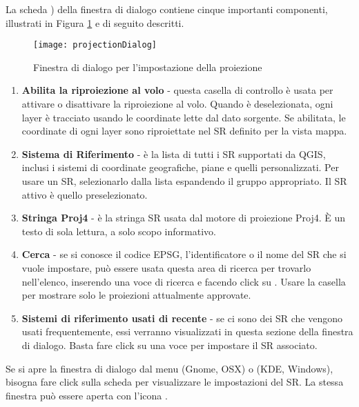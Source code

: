 La scheda ) della finestra di dialogo 
contiene cinque importanti componenti, illustrati in Figura \ref{fig:projections} e di seguito descritti.

\begin{figure}[ht]
   \centering
   \texttt{[image: projectionDialog]}
   \caption{Finestra di dialogo per l'impostazione della proiezione \nixcaption}\label{fig:projections}
\end{figure}

\begin{enumerate}
\item \textbf{Abilita la riproiezione al volo} -
questa casella di controllo è usata per attivare o disattivare la riproiezione al volo. 
Quando è deselezionata, ogni layer è tracciato usando le coordinate lette dal dato sorgente. 
Se abilitata, le coordinate di ogni layer sono riproiettate nel SR definito per la vista mappa.
\item \textbf{Sistema di Riferimento} - è la lista di tutti i SR supportati da QGIS, inclusi i
sistemi di coordinate geografiche, piane e quelli personalizzati. Per usare un SR, selezionarlo
dalla lista espandendo il gruppo appropriato. Il SR attivo è quello preselezionato.
\item \textbf{Stringa Proj4} - è la stringa SR usata dal motore di proiezione Proj4. 
È un testo di sola lettura, a solo scopo informativo.
\item \textbf{Cerca} - se si conosce il codice EPSG, l'identificatore o il nome del SR che si vuole impostare, 
può essere usata questa area di ricerca per trovarlo nell'elenco, inserendo una voce di ricerca e facendo click 
su . Usare la casella  per mostrare solo le proiezioni attualmente approvate.
\item \textbf{Sistemi di riferimento usati di recente} - se ci sono dei SR che vengono usati frequentemente, 
essi verranno visualizzati in questa sezione della finestra di dialogo. Basta fare click su una voce per impostare il SR associato.
\end{enumerate}

\begin{Tip}
\caption{\textsc{Finestra di dialogo Proprietà del progetto}}
Se si apre la finestra di dialogo  dal menu  (Gnome, OSX) 
o  (KDE, Windows), bisogna fare click sulla scheda  per visualizzare le impostazioni del SR. La stessa finestra può essere aperta con 
l'icona .
\end{Tip}

